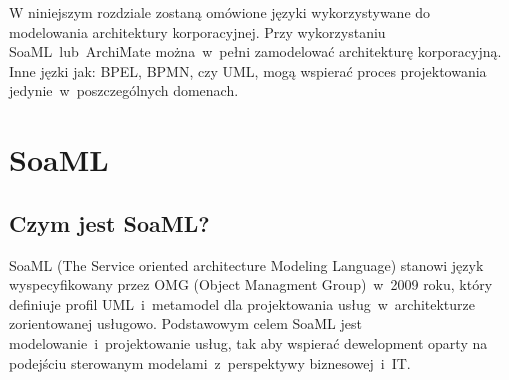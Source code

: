 W niniejszym rozdziale zostaną omówione języki wykorzystywane do modelowania architektury korporacyjnej. Przy wykorzystaniu SoaML~lub~ArchiMate można~w~pełni zamodelować architekturę korporacyjną. Inne jęzki jak: BPEL, BPMN, czy UML, mogą wspierać proces projektowania jedynie~w~poszczególnych domenach.

\section{SoaML}
\subsection{Czym jest SoaML?}
SoaML (The Service oriented architecture Modeling Language) stanowi język wyspecyfikowany przez OMG (Object Managment Group)~w~2009 roku, który definiuje profil UML~i~metamodel dla projektowania usług~w~architekturze zorientowanej usługowo. Podstawowym celem SoaML jest modelowanie~i~projektowanie usług, tak aby wspierać dewelopment oparty na podejściu sterowanym modelami~z~perspektywy biznesowej~i~IT.

